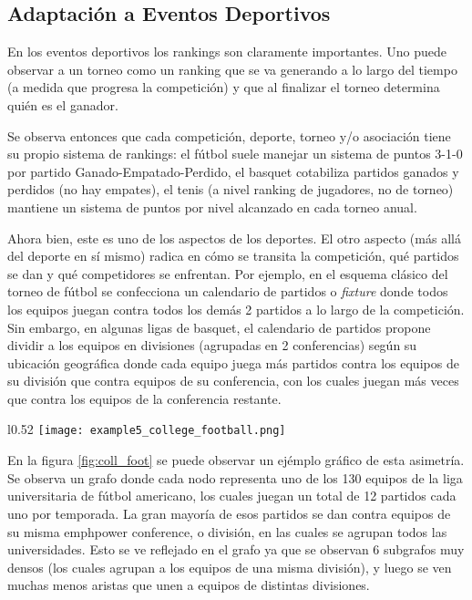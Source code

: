 \subsection{Adaptaci\'on a Eventos Deportivos}
\par En los eventos deportivos los rankings son claramente
importantes. Uno puede observar a un torneo como un ranking que se va generando
a lo largo del tiempo (a medida que progresa la competici\'on) y que al
finalizar el torneo determina quién es el ganador.

\par Se observa entonces que cada competici\'on, deporte, torneo y/o
asociaci\'on tiene su propio sistema de rankings: el f\'utbol suele manejar un
sistema de puntos 3-1-0 por partido Ganado-Empatado-Perdido, el basquet
cotabiliza partidos ganados y perdidos (no hay empates), el tenis (a nivel
ranking de jugadores, no de torneo) mantiene un sistema de puntos por nivel
alcanzado en cada torneo anual.

\par Ahora bien, este es uno de los aspectos de los deportes. El otro aspecto
(m\'as all\'a del deporte en sí mismo) radica en cómo se transita la
competici\'on, qué partidos se dan y qué competidores se enfrentan. Por ejemplo,
en el esquema cl\'asico del torneo de f\'utbol se confecciona un calendario de
partidos o \emph{fixture} donde todos los equipos juegan contra todos los
dem\'as 2 partidos a lo largo de la competici\'on. Sin embargo, en algunas ligas
de basquet, el calendario de partidos propone dividir a los equipos en
divisiones (agrupadas en 2 conferencias) seg\'un su ubicaci\'on geogr\'afica
donde cada equipo juega m\'as partidos contra los equipos de su divisi\'on que
contra equipos de su conferencia, con los cuales juegan m\'as veces que contra
los equipos de la conferencia restante.

\begin{wrapfigure}[22]{l}{0.52\textwidth}
    \centering
    \texttt{[image: example5\_college\_football.png]}
    \caption{Grafo de Encuentros de la liga de f\'utbol americano
        universitaria~\cite{college_football_graph}}
    \label{fig:coll_foot}
\end{wrapfigure}

\par En la figura \ref{fig:coll_foot} se puede observar un ej\'emplo gr\'afico
de esta asimetr\'ia. Se observa un grafo donde cada nodo representa uno de los
130 equipos de la liga universitaria de f\'utbol americano, los cuales juegan un
total de 12 partidos cada uno por temporada. La gran mayor\'ia de esos partidos
se dan contra equipos de su misma emph{power conference}, o divisi\'on, en las
cuales se agrupan todos las universidades. Esto se ve reflejado en el grafo ya
que se observan 6 subgrafos muy densos (los cuales agrupan a los equipos de
una misma divisi\'on), y luego se ven muchas menos aristas que unen a equipos de
distintas divisiones.

